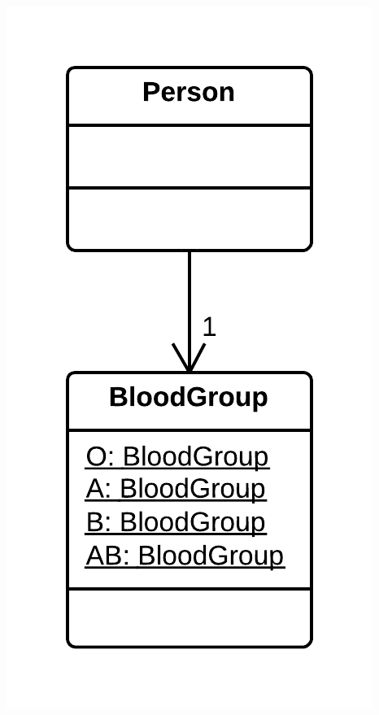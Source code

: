 \documentclass[11pt,a4paper,oneside]{book}
\begin{document}
\begin{itemize}
    \centering \includegraphics[scale=0.2]{replacetypecodewithclasssolution}
\end{itemize}
    
\end{document}
